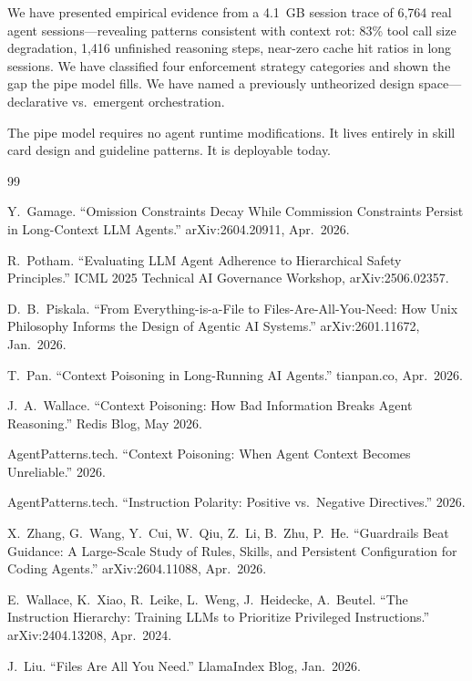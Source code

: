\documentclass[11pt,a4paper]{article}
\begin{document}
We have presented empirical evidence from a 4.1~GB session trace of 6,764 real agent sessions---revealing patterns consistent with context rot: 83\% tool call size degradation, 1,416 unfinished reasoning steps, near-zero cache hit ratios in long sessions. We have classified four enforcement strategy categories and shown the gap the pipe model fills. We have named a previously untheorized design space---declarative vs.\ emergent orchestration.

The pipe model requires no agent runtime modifications. It lives entirely in skill card design and guideline patterns. It is deployable today.

\begin{thebibliography}{99}

Y.\ Gamage.
``Omission Constraints Decay While Commission Constraints Persist in Long-Context LLM Agents.''
arXiv:2604.20911, Apr.\ 2026.

R.\ Potham.
``Evaluating LLM Agent Adherence to Hierarchical Safety Principles.''
ICML 2025 Technical AI Governance Workshop, arXiv:2506.02357.

D.\ B.\ Piskala.
``From Everything-is-a-File to Files-Are-All-You-Need: How Unix Philosophy Informs the Design of Agentic AI Systems.''
arXiv:2601.11672, Jan.\ 2026.

T.\ Pan.
``Context Poisoning in Long-Running AI Agents.''
tianpan.co, Apr.\ 2026.

J.\ A.\ Wallace.
``Context Poisoning: How Bad Information Breaks Agent Reasoning.''
Redis Blog, May 2026.

AgentPatterns.tech.
``Context Poisoning: When Agent Context Becomes Unreliable.''
2026.

AgentPatterns.tech.
``Instruction Polarity: Positive vs.\ Negative Directives.''
2026.

X.\ Zhang, G.\ Wang, Y.\ Cui, W.\ Qiu, Z.\ Li, B.\ Zhu, P.\ He.
``Guardrails Beat Guidance: A Large-Scale Study of Rules, Skills, and Persistent Configuration for Coding Agents.''
arXiv:2604.11088, Apr.\ 2026.

E.\ Wallace, K.\ Xiao, R.\ Leike, L.\ Weng, J.\ Heidecke, A.\ Beutel.
``The Instruction Hierarchy: Training LLMs to Prioritize Privileged Instructions.''
arXiv:2404.13208, Apr.\ 2024.

J.\ Liu.
``Files Are All You Need.''
LlamaIndex Blog, Jan.\ 2026.


\end{thebibliography}
\end{document}
